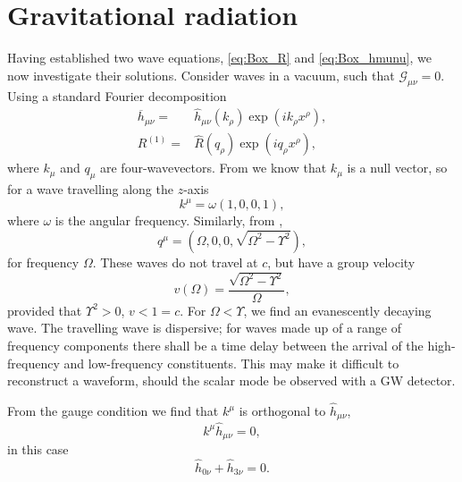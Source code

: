 \section{Gravitational radiation}\label{sec:Rad}

Having established two wave equations, \eqref{eq:Box_R} and \eqref{eq:Box_hmunu}, we now investigate their solutions. Consider waves in a vacuum, such that $\mathcal{G}_{\mu\nu} = 0$. Using a standard Fourier decomposition
\begin{subequations}
\begin{align}
\overline{h}_{\mu\nu} = {} & \widehat{h}_{\mu\nu}(k_\rho) \exp\left(ik_\rho x^\rho\right),\\
R^{(1)} = {} & \widehat{R}(q_\rho) \exp\left(iq_\rho x^\rho\right),
\end{align}
\end{subequations}
where $k_\mu$ and $q_\mu$ are four-wavevectors. From  we know that $k_\mu$ is a null vector, so for a wave travelling along the $z$-axis
\begin{equation}
k^\mu = \omega(1, 0, 0, 1),
\end{equation}
where $\omega$ is the angular frequency. Similarly, from ,
\begin{equation}
q^\mu = \left(\Omega, 0, 0, \sqrt{\Omega^2 - \Upsilon^2}\right),
\label{eq:Ricci_q}
\end{equation}
for frequency $\Omega$. These waves do not travel at $c$, but have a group velocity
\begin{equation}
v(\Omega) = \dfrac{\sqrt{\Omega^2 - \Upsilon^2}}{\Omega},
\end{equation}
provided that $\Upsilon^2 > 0$, $v < 1 = c$. For $\Omega < \Upsilon$, we find an evanescently decaying wave. The travelling wave is dispersive; for waves made up of a range of frequency components there shall be a time delay between the arrival of the high-frequency and low-frequency constituents. This may make it difficult to reconstruct a waveform, should the scalar mode be observed with a GW detector.

From the gauge condition  we find that $k^\mu$ is orthogonal to $\widehat{h}_{\mu\nu}$,
\begin{equation}
k^\mu\widehat{h}_{\mu\nu} = 0,
\end{equation}
in this case
\begin{equation}
\widehat{h}_{0\nu} + \widehat{h}_{3\nu} = 0.
\label{eq:Transverse}
\end{equation}

